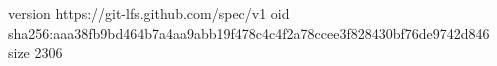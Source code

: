 version https://git-lfs.github.com/spec/v1
oid sha256:aaa38fb9bd464b7a4aa9abb19f478c4c4f2a78ccee3f828430bf76de9742d846
size 2306
